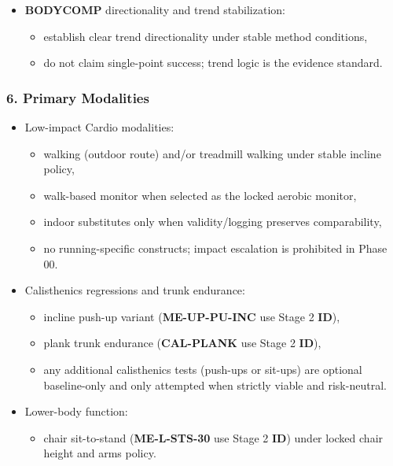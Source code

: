 \documentclass[10pt]{article}
\begin{document}
\begin{itemize}
\item \textbf{BODYCOMP} directionality and trend stabilization:
  \begin{itemize}
  \item establish clear trend directionality under stable method conditions,
  \item do not claim single-point success; trend logic is the evidence standard.
  \end{itemize}
\end{itemize}

\subsubsection*{6. Primary Modalities}

\begin{itemize}
\item Low-impact Cardio modalities:
  \begin{itemize}
  \item walking (outdoor route) and/or treadmill walking under stable incline policy,
  \item walk-based monitor when selected as the locked aerobic monitor,
  \item indoor substitutes only when validity/logging preserves comparability,
  \item no running-specific constructs; impact escalation is prohibited in Phase 00.
  \end{itemize}

\item Calisthenics regressions and trunk endurance:
  \begin{itemize}
  \item incline push-up variant (\textbf{ME-UP-PU-INC} use Stage 2 \textbf{ID}),
  \item plank trunk endurance (\textbf{CAL-PLANK} use Stage 2 \textbf{ID}),
  \item any additional calisthenics tests (push-ups or sit-ups) are optional baseline-only and only attempted when strictly viable and risk-neutral.
  \end{itemize}

\item Lower-body function:
  \begin{itemize}
  \item chair sit-to-stand (\textbf{ME-L-STS-30} use Stage 2 \textbf{ID}) under locked chair height and arms policy.
  \end{itemize}


\end{itemize}
\end{document}
